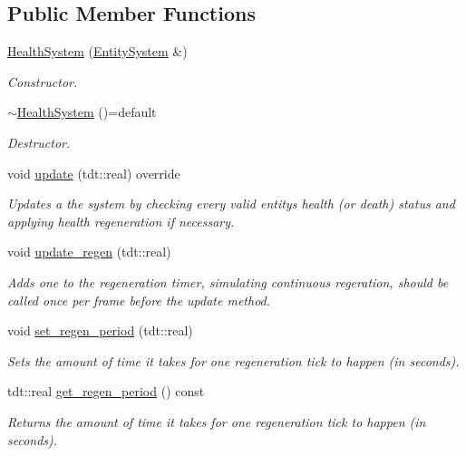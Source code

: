 \subsection*{Public Member Functions}
\begin{DoxyCompactItemize}
\item 
\hyperlink{class_health_system_ae843e85e6e16348860fe5cf5c5bde5b8}{Health\+System} (\hyperlink{class_entity_system}{Entity\+System} \&)
\begin{DoxyCompactList}\small\item\em Constructor. \end{DoxyCompactList}\item 
\hyperlink{class_health_system_a843b4d2e235533ab614e68826e47edf0}{$\sim$\+Health\+System} ()=default
\begin{DoxyCompactList}\small\item\em Destructor. \end{DoxyCompactList}\item 
void \hyperlink{class_health_system_a20f7adc2c2ab6e92ba8dd02e3ec95ba2}{update} (tdt\+::real) override
\begin{DoxyCompactList}\small\item\em Updates a the system by checking every valid entity\textquotesingle{}s health (or death) status and applying health regeneration if necessary. \end{DoxyCompactList}\item 
void \hyperlink{class_health_system_ade496933a64a34085c1169bcff1f2607}{update\+\_\+regen} (tdt\+::real)
\begin{DoxyCompactList}\small\item\em Adds one to the regeneration timer, simulating continuous regeration, should be called once per frame before the update method. \end{DoxyCompactList}\item 
void \hyperlink{class_health_system_ad5ae1e0a7099513a0c77bed14c92852c}{set\+\_\+regen\+\_\+period} (tdt\+::real)
\begin{DoxyCompactList}\small\item\em Sets the amount of time it takes for one regeneration tick to happen (in seconds). \end{DoxyCompactList}\item 
tdt\+::real \hyperlink{class_health_system_af2cbc492357afd14e815e14aa9dabda1}{get\+\_\+regen\+\_\+period} () const 
\begin{DoxyCompactList}\small\item\em Returns the amount of time it takes for one regeneration tick to happen (in seconds). \end{DoxyCompactList}\end{DoxyCompactItemize}
